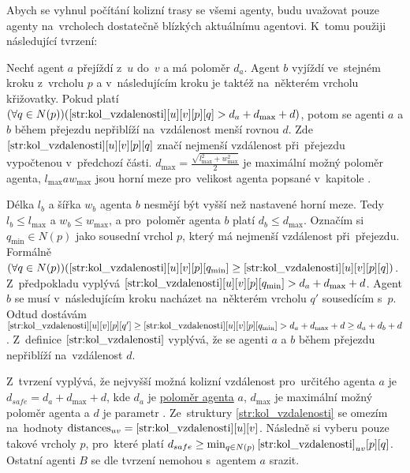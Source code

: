 Abych se vyhnul počítání kolizní trasy se všemi agenty,
budu uvažovat pouze agenty na~vrcholech dostatečně blízkých aktuálnímu agentovi.
K~tomu použiji následující tvrzení:

\begin{tvrz}
	\label{tvrz:kol_kolizni_vzdalenost}
	Nechť agent $a$ přejíždí z~$u$ do~$v$ a má poloměr $d_a$.
	Agent $b$ vyjíždí ve~stejném kroku z~vrcholu $p$ a v~následujícím kroku je taktéž na~některém vrcholu křižovatky.
	Pokud platí $(\forall q \in N(p))(\ref{str:kol_vzdalenosti}[u][v][p][q] > d_a + d_{\max} + d)$,
	potom se agenti $a$ a $b$ během přejezdu nepřiblíží na~vzdálenost menší rovnou $d$.
	Zde $\ref{str:kol_vzdalenosti}[u][v][p][q]$ značí nejmenší vzdálenost při~přejezdu vypočtenou v~předchozí části.
	$d_{\max} = \frac{\sqrt{l_{\max}^2 + w_{\max}^2}}{2}$ je maximální možný poloměr agenta,
	$l_{\max} a w_{\max}$ jsou horní meze pro~velikost agenta popsané v~kapitole .
\end{tvrz}
\begin{dukaz}
	Délka $l_b$ a šířka $w_b$ agenta $b$ nesmějí být vyšší než nastavené horní meze.
	Tedy $l_b \leq l_{\max}$ a $w_b \leq w_{\max}$, a pro~poloměr agenta $b$ platí $d_b \leq d_{\max}$.
	Označím si $q_{\min} \in N(p)$ jako sousední vrchol $p$, který má nejmenší vzdálenost při~přejezdu.
	Formálně $(\forall q \in N(p))(\ref{str:kol_vzdalenosti}[u][v][p][q_{\min}] \geq \ref{str:kol_vzdalenosti}[u][v][p][q])$.
	Z~předpokladu vyplývá $\ref{str:kol_vzdalenosti}[u][v][p][q_{\min}] > d_a + d_{\max} + d$.
	Agent $b$ se musí v~následujícím kroku nacházet na~některém vrcholu $q'$ sousedícím s~$p$.
	Odtud dostávám $\ref{str:kol_vzdalenosti}[u][v][p][q'] \geq \ref{str:kol_vzdalenosti}[u][v][p][q_{\min}] >
	d_a + d_{\max} + d \geq d_a + d_b + d$.
	Z~definice $\ref{str:kol_vzdalenosti}$ vyplývá, že se agenti $a$ a $b$ během přejezdu nepřiblíží na~vzdálenost $d$.
\end{dukaz}


Z~tvrzení vyplývá, že nejvyšší možná kolizní vzdálenost pro~určitého agenta $a$ je $d_{safe} = d_a + d_{\max} + d$,
kde $d_a$ je \hyperref[par:polomer_agenta]{poloměr agenta} $a$, $d_{\max}$ je maximální možný poloměr agenta a
$d$ je parametr .
Ze~struktury \ref{str:kol_vzdalenosti} se omezím na~hodnoty $\textrm{distances}_{uv} = \ref{str:kol_vzdalenosti}[u][v]$.
Následně si vyberu pouze takové vrcholy $p$, pro~které platí
$d_{safe} \geq \min_{q\in N(p)} \ref{str:kol_vzdalenosti}_{uv}[p][q]$.
Ostatní agenti $B$ se dle tvrzení nemohou s~agentem $a$ srazit.

